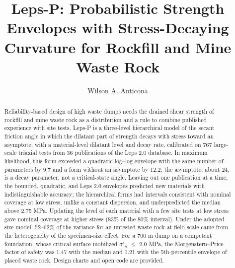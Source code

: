 \documentclass[Journal,letterpaper]{ascelike-new}
\begin{document}
\title{Leps-P: Probabilistic Strength Envelopes with Stress-Decaying Curvature for Rockfill and Mine Waste Rock}
\author[1]{Wilson A. Anticona}
\maketitle

\begin{abstract}
\noindent Reliability-based design of high waste dumps needs the drained shear strength of rockfill and mine waste rock as a distribution and a rule to combine published experience with site tests. Leps-P is a three-level hierarchical model of the secant friction angle in which the dilatant part of strength decays with stress toward an asymptote, with a material-level dilatant level and decay rate, calibrated on 767 large-scale triaxial tests from 36 publications of the Leps 2.0 database. In maximum likelihood, this form exceeded a quadratic log--log envelope with the same number of parameters by 9.7 and a form without an asymptote by 12.2; the asymptote, about 24\textdegree{}, is a decay parameter, not a critical-state angle. Leaving out one publication at a time, the bounded, quadratic, and Leps 2.0 envelopes predicted new materials with indistinguishable accuracy; the hierarchical forms had intervals consistent with nominal coverage at low stress, unlike a constant dispersion, and underpredicted the median above 2.75 MPa. Updating the level of each material with a few site tests at low stress gave nominal coverage at higher stress (83\% of the 80\% interval). Under the adopted size model, 52--62\% of the variance for an untested waste rock at field scale came from the heterogeneity of the specimen-size effect. For a 700 m dump on a competent foundation, whose critical surface mobilized $\sigma'_n$ $\le$ 2.0 MPa, the Morgenstern--Price factor of safety was 1.47 with the median and 1.21 with the 5th-percentile envelope of placed waste rock. Design charts and open code are provided.

\end{abstract}
\end{document}
